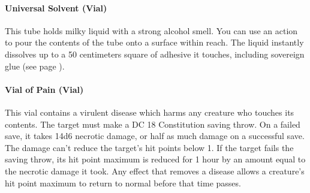     \paragraph{Universal Solvent (Vial)} \label{item::universalsolvent}
        This tube holds milky liquid with a strong alcohol smell.
        You can use an action to pour the contents of the tube onto a surface within reach.
        The liquid instantly dissolves up to a 50 centimeters square of adhesive it touches, including sovereign glue (see page \pageref{item::sovereignglue}).
    \paragraph{Vial of Pain (Vial)} %
        This vial contains a virulent disease which harms any creature who touches its contents.
        The target must make a DC 18 Constitution saving throw.
        On a failed save, it takes 14d6 necrotic damage, or half as much damage on a successful save.
        The damage can't reduce the target's hit points below 1.
        If the target fails the saving throw, its hit point maximum is reduced for 1 hour by an amount equal to the necrotic damage it took.
        Any effect that removes a disease allows a creature's hit point maximum to return to normal before that time passes.
\newpage
